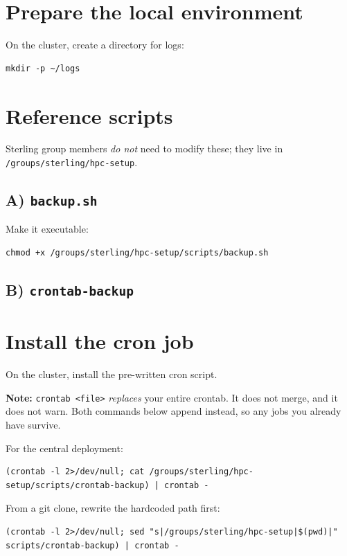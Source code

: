 \documentclass[12pt,letterpaper]{article}
\begin{document}
\section{Prepare the local environment}
\label{sec:prepare}
On the cluster, create a directory for logs:
\begin{lstlisting}[style=custombash]
mkdir -p ~/logs
\end{lstlisting}

\section{Reference scripts}
\label{sec:reference-scripts}
Sterling group members \emph{do not} need to modify these; they live in
\verb|/groups/sterling/hpc-setup|.

\subsection{A) \texttt{backup.sh}}


Make it executable:
\begin{lstlisting}[style=custombash]
chmod +x /groups/sterling/hpc-setup/scripts/backup.sh
\end{lstlisting}

\subsection{B) \texttt{crontab-backup}}


\section{Install the cron job}
\label{sec:install-cron}
On the cluster, install the pre-written cron script.

\textbf{Note:} \texttt{crontab <file>} \emph{replaces} your entire crontab. It does not
merge, and it does not warn. Both commands below append instead, so any jobs you
already have survive.

For the central deployment:
\begin{lstlisting}[style=custombash]
(crontab -l 2>/dev/null; cat /groups/sterling/hpc-setup/scripts/crontab-backup) | crontab -
\end{lstlisting}

From a git clone, rewrite the hardcoded path first:
\begin{lstlisting}[style=custombash]
(crontab -l 2>/dev/null; sed "s|/groups/sterling/hpc-setup|$(pwd)|" scripts/crontab-backup) | crontab -
\end{lstlisting}
\end{document}
